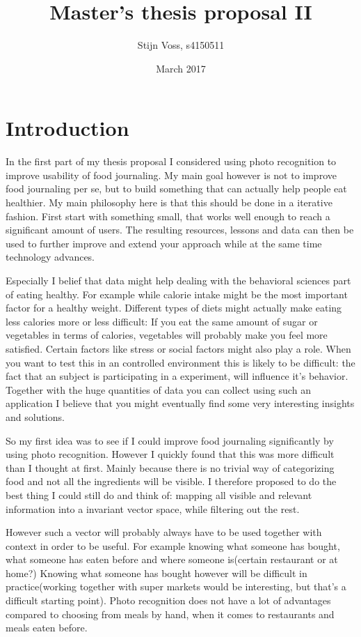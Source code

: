 \documentclass[a4paper]{scrartcl}
\title{Master's thesis proposal II}
\author{Stijn Voss, s4150511 }
\date{March 2017}
\begin{document}
\maketitle

\section{Introduction}
In the first part of my thesis proposal I considered using photo recognition to improve usability of food journaling. My main goal however is not to improve food journaling per se, but to build something that can actually help people eat healthier. My main philosophy here is that this should be done in a iterative fashion. First start with something small, that works well enough to reach a significant amount of users. The resulting resources, lessons and data can then be used to further improve and extend your approach while at the same time technology advances. 

Especially I belief that data might help dealing with the behavioral sciences part of eating healthy. For example while calorie intake might be the most important factor for a healthy weight. Different types of diets might actually make eating less calories more or less difficult: If you eat the same amount of sugar or vegetables in terms of calories, vegetables will probably make you feel more satisfied. Certain factors like stress or social factors might also play a role. When you want to test this in an controlled environment this is likely to be difficult: the fact that an subject is participating in a experiment, will influence it's behavior. Together with the huge quantities of data you can collect using such an application I believe that you might eventually find some very interesting insights and solutions. 

So my first idea was to see if I could improve food journaling significantly by using photo recognition. However I quickly found that this was more difficult than I thought at first. Mainly because there is no trivial way of categorizing food and not all the ingredients will be visible. I therefore proposed to do the best thing I could still do and think of: mapping all visible and relevant information into a invariant vector space, while filtering out the rest. 

However such a vector will probably always have to be used together with context in order to be useful. For example knowing what someone has bought, what someone has eaten before and where someone is(certain restaurant or at home?) Knowing what someone has bought however will be difficult in practice(working together with super markets would be interesting, but that's a difficult starting point). Photo recognition does not have a lot of advantages compared to choosing from meals by hand, when it comes to restaurants and meals eaten before. 
\end{document}
